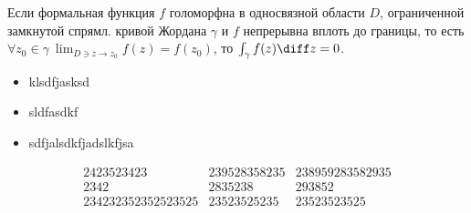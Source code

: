 \begin{theorem}
	Если формальная функция $f$ голоморфна в односвязной области $D$, ограниченной замкнутой спрямл. кривой Жордана $\gamma$ и $f$ непрерывна вплоть до границы, то есть $\forall  z_0 \in \gamma \ \lim_{D \ni z \rightarrow z_0}f(z) = f(z_0)$, то $\int_{\gamma}f(z)\diff z = 0$.
\end{theorem}

\begin{itemize}
	\item klsdfjasksd
	\item sldfasdkf
	\item sdfjalsdkfjadslkfjsa
\end{itemize}

\begin{align}
	2423523423         & 239528358235 & 238959283582935 \\
	2342               & 2835238      & 293852          \\
	234232352352523525 & 23523525235  & 23523523525
\end{align}


